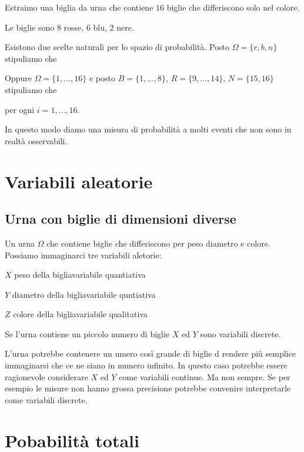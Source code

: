 \documentclass[12pt,openany]{book}
\theoremstyle{mio}
\theoremstyle{liscio}
\begin{document}
Estraimo una biglia da urna che contiene $16$ biglie che differiscono solo nel colore.

Le biglie sono $8$ rosse, $6$ blu, $2$ nere.

Esistono due scelte naturali per lo spazio di probabilità. Posto $\Omega=\{r,b,n\}$ stipuliamo che


Oppure $\Omega=\{1,\dots,16\}$ e posto $B=\{1,\dots,8\}$, $R=\{9,\dots,14\}$, $N=\{15,16\}$ stipuliamo che 


\hfil per ogni $i=1,\dots,16$.

In questo modo diamo una misura di probabilità a molti eventi che non sono in realtà osservabili. 



\hfill{}\clearpage\section{Variabili aleatorie}

\subsection{Urna con biglie di dimensioni diverse}
\label{Urna_biglie_diverse}

Un urna $\Omega$ che contiene biglie che differiscono per peso diametro e colore. Possiamo immaginarci tre variabili aletorie:

$X$ peso della biglia\hfill variabile quantiativa

$Y$ diametro della biglia\hfill variabile quntiativa

$Z$ colore della biglia\hfill variabile qualitativa

Se l'urna contiene un piccolo numero di biglie $X$ ed $Y$ sono variabili discrete.

L'urna potrebbe contenere un umero così grande di biglie d rendere più semplice immaginarsi che ce ne siano in numero infinito. In questo caso potrebbe essere ragionevole considerare $X$ ed $Y$ come variabili continue. Ma non sempre. Se per esempio le misure non hanno grossa precisione potrebbe convenire interpretarle come variabili discrete.

\hfill{}\clearpage\section{Pobabilità totali}
\end{document}
